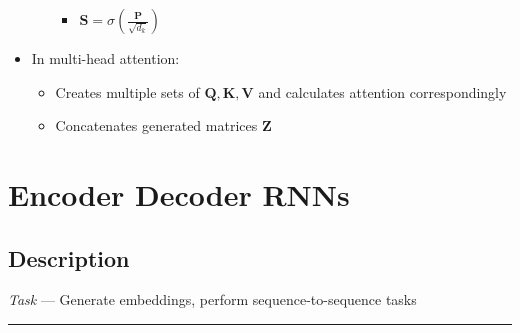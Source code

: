 \begin{itemize}
\begin{itemize}
\begin{itemize}
            \item $\boldsymbol{S} = \sigma(\frac{\boldsymbol{P}}{\sqrt{d_k}})$
        \end{itemize}
    \end{itemize}
    \item In multi-head attention:
    \begin{itemize}
        \item Creates multiple sets of $\boldsymbol{Q,K,V}$ and calculates attention correspondingly
        \item Concatenates generated matrices $\boldsymbol{Z}$
    \end{itemize}
\end{itemize}

\section{Encoder Decoder RNNs}
\subsection*{Description}
\emph{Task} --- Generate embeddings, perform sequence-to-sequence tasks

{\color{black}\hrule height 0.001mm}

